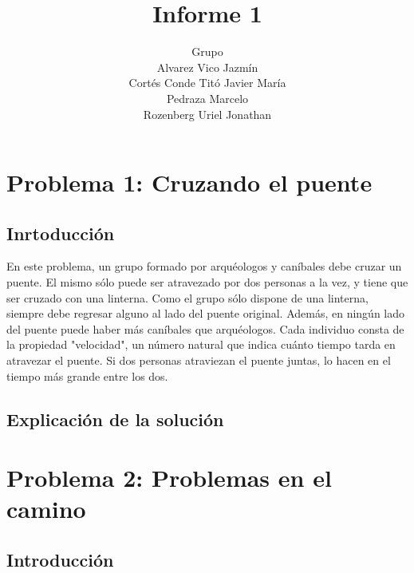 \documentclass[spanish,12pt]{article}
\begin{document}
\title{Informe 1}

\author{Grupo  \\Alvarez Vico Jazm\'in\\Cortés Conde Titó Javier María\\Pedraza Marcelo \\ Rozenberg Uriel Jonathan}


\maketitle

\clearpage

\tableofcontents
\cleardoublepage

\section{Problema 1: Cruzando el puente}

\subsection{Inrtoducción}

En este problema, un grupo formado por arquéologos y caníbales debe cruzar un puente. El mismo sólo puede ser atravezado por dos personas a la vez, y tiene que ser cruzado con una linterna. Como el grupo sólo dispone de una linterna, siempre debe regresar alguno al lado del puente original. Además, en ningún lado del puente puede haber más caníbales que arquéologos.
Cada individuo consta de la propiedad "velocidad", un número natural que indica cuánto tiempo tarda en atravezar el puente. Si dos personas atraviezan el puente juntas, lo hacen en el tiempo más grande entre los dos.


\subsection{Explicación de la solución}


\section{Problema 2: Problemas en el camino}

\subsection{Introducción}
\end{document}
